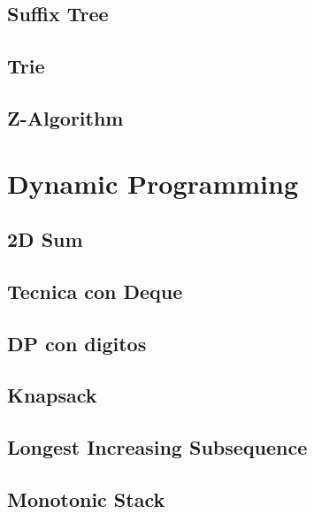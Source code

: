 \subsection{Suffix Tree}
\raggedbottom
\hrulefill
\subsection{Trie}
\raggedbottom
\hrulefill
\subsection{Z-Algorithm}
\raggedbottom
\hrulefill
\newpage

\section{Dynamic Programming}
\subsection{2D Sum}
\raggedbottom
\hrulefill
\subsection{Tecnica con Deque}
\raggedbottom
\hrulefill
\subsection{DP con digitos}
\raggedbottom
\hrulefill
\subsection{Knapsack}
\raggedbottom
\hrulefill
\subsection{Longest Increasing Subsequence}
\raggedbottom
\hrulefill
\subsection{Monotonic Stack}
\raggedbottom
\hrulefill
